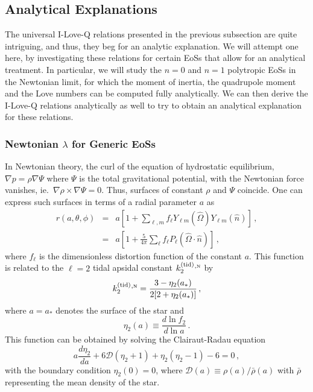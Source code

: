 \documentclass[aps,twocolumn,nofootinbib,showpacs,superscriptaddress,hyperref]{revtex4-1}
\newcommand\be{\begin{equation}}
\newcommand\ba{\begin{eqnarray}}
\newcommand\ee{\end{equation}}
\newcommand\ea{\end{eqnarray}}
\newcommand{\nn}{\nonumber}
\newcommand{\tid}{\mathrm{(tid)}}
\newcommand{\N}{{\mbox{\tiny N}}}
\begin{document}
\subsection{Analytical Explanations}
\label{analytic-exp}

The universal I-Love-Q relations presented in the previous subsection are quite intriguing, and thus, they beg for an analytic explanation. We will attempt one here, by investigating these relations for certain EoSs that allow for an analytical treatment. In particular, we will study the $n=0$ and $n=1$ polytropic EoSs in the Newtonian limit, for which the moment of inertia, the quadrupole moment and the Love numbers can be computed fully analytically. We can then derive the I-Love-Q relations analytically as well to try to obtain an analytical explanation for these relations. 

\subsubsection{Newtonian $\lambda$ for Generic EoSs}
\label{sec:Love-Newton}

In Newtonian theory, the curl of the equation of hydrostatic equilibrium, $\nabla p = \rho \nabla \Psi$ where $\Psi$ is the total gravitational potential, with the Newtonian force vanishes, ie.~$\nabla \rho \times \nabla \Psi =0$. Thus, surfaces of constant $\rho$ and $\Psi$ coincide. One can express such surfaces in terms of a radial parameter $a$ as~\cite{mora-will}
%
\allowdisplaybreaks
\ba
r(a, \theta, \phi) &=& a \left[ 1 + \sum_{\ell, m} f_{\ell} Y_{\ell m} (\hat{\Omega}) Y_{\ell m} (\hat{n}) \right]\,, \nn \\
&=& a \left[ 1 + \frac{5}{4\pi} \sum_{\ell} f_{\ell} P_\ell (\hat{\Omega} \cdot \hat{n}) \right]\,, 
\ea
% 
where $f_\ell$ is the dimensionless distortion function of the constant $a$. This function is related to the $\ell =2$ tidal apsidal constant $k_2^\tid{}^{,\N}$ by
%
\be
k_2^\tid{}^{,\N} = \frac{3-\eta_2(a_*)}{2[2 + \eta_2(a_*)]}\,,
\label{k2N1}
\ee
%
where $a=a_*$ denotes the surface of the star and
%
\be
\eta_2 (a) \equiv \frac{d \ln f_2}{d \ln a}\,.
\ee
%
This function can be obtained by solving the Clairaut-Radau equation~\cite{brooker-olle,mora-will}
%
\be
a\frac{d\eta_2}{d a} + 6 \mathcal{D} (\eta_2 +1) + \eta_2 (\eta_2 -1) -6 =0\,,
\label{Clairaut-Radau}
\ee
%
with the boundary condition $\eta_2 (0) =0$, where $\mathcal{D}(a) \equiv \rho(a)/\bar{\rho}(a)$ with $\bar{\rho}$ representing the mean density of the star. 
\end{document}
